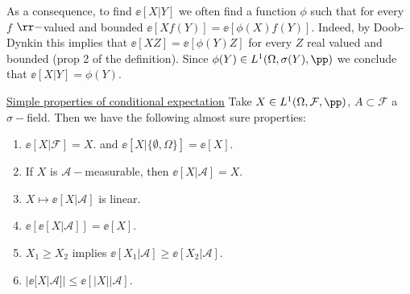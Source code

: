 \documentclass[../main.tex]{subfiles}
\begin{document}
As a consequence, to find $\ee[X | Y]$ we often find a function $\phi$ such
that for every $f$ $\rr-$valued and bounded
$\ee[X f(Y)] = \ee[\phi(X) f(Y)]$. Indeed, by Doob-Dynkin this implies that
$\ee[X Z] = \ee[\phi(Y) Z]$ for every $Z$ real valued and bounded (prop 2 of
the definition). Since $\phi(Y) \in L^1(\Omega, \sigma(Y), \pp)$ we conclude
that $\ee[X|Y] = \phi(Y)$.


\vspace{1em}\noindent
\underline{Simple properties of conditional expectation}
Take $X \in L^1(\Omega, \mathcal{F}, \pp)$, $A \subset \mathcal{F}$ a
$\sigma-$field. Then we have the following almost sure properties:
\begin{enumerate}
  \item $\ee[X | \mathcal{F}] = X$. and $\ee[X | \{ \emptyset, \Omega \}] =
    \ee[X] $.
  \item If $X$ is $\mathcal{A}-$measurable, then $\ee[X | \mathcal{A}] = X$.
  \item $X \mapsto \ee[X | \mathcal{A}]$ is linear.
  \item $\ee[\ee[X | \mathcal{A}]] = \ee[X]$.
  \item $X_1 \geq X_2$ implies $\ee[X_1 | \mathcal{A}] \geq \ee[X_2 |
    \mathcal{A}]$.
  \item $|\ee[X | \mathcal{A}]| \leq \ee[|X| | \mathcal{A}]$.
\end{enumerate}
\end{document}
